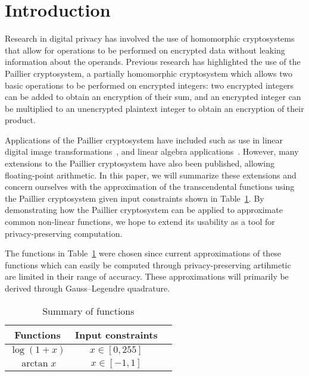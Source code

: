 \section{Introduction}
Research in digital privacy has involved the use of homomorphic cryptosystems that allow for operations to be performed on encrypted data without leaking information about the operands.
Previous research has highlighted the use of the Paillier cryptosystem, a partially homomorphic cryptosystem which allows two basic operations to be performed on encrypted integers: two encrypted integers can be added to obtain an encryption of their sum, and an encrypted integer can be multiplied to an unencrypted plaintext integer to obtain an encryption of their product.

Applications of the Paillier cryptosystem have included such as use in linear digital image transformations~\cite{ziad_cryptoimg:_2016}, and linear algebra applications~\cite{hutchison_privacy-preserving_2009}. However, many extensions to the Paillier cryptosystem have also been published, allowing floating-point arithmetic. In this paper, we will summarize these extensions and concern ourselves with the approximation of the transcendental functions using the Paillier cryptosystem given input constraints shown in Table~\ref{tab:inputconstraints}. By demonstrating how the Paillier cryptosystem can be applied to approximate common non-linear functions, we hope to extend its usability as a tool for privacy-preserving computation.

The functions in Table~\ref{tab:inputconstraints} were chosen since current approximations of these functions which can easily be computed through privacy-preserving artihmetic are limited in their range of accuracy. These approximations will primarily be derived through Gauss--Legendre quadrature.
\begin{table}
	\caption{Summary of functions}
	\label{tab:inputconstraints}
	\begin{tabular}{ccl}
		\toprule
		Functions & Input constraints\\
		\midrule
		$\log\left(1+x\right)$ & $x\in[0,255]$\\
		$\arctan x$ & $x\in[-1,1]$\\
	    \bottomrule
    \end{tabular}
\end{table}

